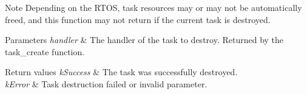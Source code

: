 \begin{DoxyNote}{Note}
Depending on the R\+T\+OS, task resources may or may not be automatically freed, and this function may not return if the current task is destroyed.
\end{DoxyNote}

\begin{DoxyParams}{Parameters}
{\em handler} & The handler of the task to destroy. Returned by the task\+\_\+create function.\\
\hline
\end{DoxyParams}

\begin{DoxyRetVals}{Return values}
{\em k\+Success} & The task was successfully destroyed. \\
\hline
{\em k\+Error} & Task destruction failed or invalid parameter. \\
\hline
\end{DoxyRetVals}
